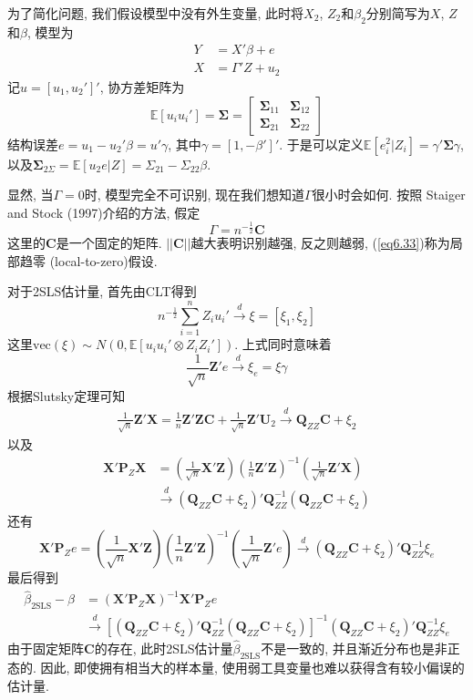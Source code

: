 \documentclass[cn, 12pt, math=mtpro2, bibstyle=apa, blue, twocol]{elegantbook}
\newcommand{\E}{\mathbb{E}}
\newcommand{\Q}{\mathbold{Q}}
\newcommand{\X}{\mathbold{X}}
\newcommand{\Z}{\mathbold{Z}}
\newcommand{\hb}{\hat{\beta}}
\newcommand{\BS}{\mathbold{\Sigma}}
\begin{document}
为了简化问题, 我们假设模型中没有外生变量, 此时将$X_2$, $Z_2$和$\beta_2$分别简写为$X$, $Z$和$\beta$, 模型为
\begin{align*}
Y&=X'\beta+e \\
X&=\Gamma'Z+u_2
\end{align*}
记$u=[u_1,u_2']'$, 协方差矩阵为
$$\E[u_iu_i']=\BS=\begin{bmatrix}
                    \BS_{11} & \BS_{12} \\
                    \BS_{21} & \BS_{22}
                  \end{bmatrix}$$
结构误差$e=u_1-u_2'\beta=u'\gamma$, 其中$\gamma=[1,-\beta']'$. 于是可以定义$\E[e_i^2|Z_i]=\gamma'\BS\gamma$, 以及$\BS_{2\Sigma}=\E[u_2e|Z]=\Sigma_{21}-\Sigma_{22}\beta$.

显然, 当$\Gamma=0$时, 模型完全不可识别, 现在我们想知道$\Gamma$很小时会如何. 按照 Staiger and Stock (1997)介绍的方法, 假定
\begin{equation}\label{eq6.33}
  \Gamma=n^{-\frac{1}{2}}\mathbold{C}
\end{equation}
这里的$\mathbold{C}$是一个固定的矩阵. $||\mathbold{C}||$越大表明识别越强, 反之则越弱, (\ref{eq6.33})称为局部趋零 (local-to-zero)假设.

对于2SLS估计量, 首先由CLT得到
$$n^{-\frac{1}{2}}\sum_{i=1}^{n}Z_iu_i'\xrightarrow{d}\xi=[\xi_1,\xi_2]$$
这里$\text{vec}(\xi)\sim N(0,\E[u_iu_i'\otimes Z_iZ_i'])$. 上式同时意味着
$$\frac{1}{\sqrt{n}}\Z'e\xrightarrow{d}\xi_e=\xi\gamma$$
根据Slutsky定理可知
\begin{align*}
\frac{1}{\sqrt{n}}\Z'\X=\frac{1}{n}\Z'\Z\mathbold{C}+\frac{1}{\sqrt{n}}\Z'\mathbold{U}_2\xrightarrow{d}\Q_{ZZ}\mathbold{C}+\xi_2
\end{align*}
以及
\begin{align*}
\X'\mathbold{P}_Z\X&=\left(\frac{1}{\sqrt{n}}\X'\Z\right)\left(\frac{1}{n}\Z'\Z\right)^{-1}\left(\frac{1}{\sqrt{n}}\Z'\X\right)\\
&\xrightarrow{d}(\Q_{ZZ}\mathbold{C}+\xi_2)'\Q_{ZZ}^{-1}(\Q_{ZZ}\mathbold{C}+\xi_2)
\end{align*}
还有
$$\X'\mathbold{P}_Ze=\left(\frac{1}{\sqrt{n}}\X'\Z\right)\left(\frac{1}{n}\Z'\Z\right)^{-1}\left(\frac{1}{\sqrt{n}}\Z'e\right)\xrightarrow{d}(\Q_{ZZ}\mathbold{C}+\xi_2)'\Q_{ZZ}^{-1}\xi_e$$
最后得到
\begin{align*}
\hb_{\text{2SLS}}-\beta&=(\X'\mathbold{P}_Z\X)^{-1}\X'\mathbold{P}_Ze \\
&\xrightarrow{d}[(\Q_{ZZ}\mathbold{C}+\xi_2)'\Q_{ZZ}^{-1}(\Q_{ZZ}\mathbold{C}+\xi_2)]^{-1}(\Q_{ZZ}\mathbold{C}+\xi_2)'\Q_{ZZ}^{-1}\xi_e
\end{align*}
由于固定矩阵$\mathbold{C}$的存在, 此时2SLS估计量$\hb_{\text{2SLS}}$不是一致的, 并且渐近分布也是非正态的. 因此, 即使拥有相当大的样本量, 使用弱工具变量也难以获得含有较小偏误的估计量.
\end{document}

